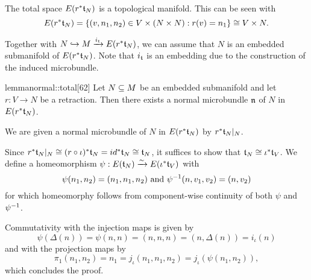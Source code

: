 \begin{myparagraph}
    The total space $E(r^*\mathfrak{t}_N)$ is a topological manifold.
    This can be seen with
    \[ E(r^*\mathfrak{t}_N) = \{(v, n_1, n_2) \in V \times (N \times N):r(v) = n_1\} \cong V \times N. \]

    Together with $N \hookrightarrow{} M \xrightarrow{i_{\mathfrak{t}}} E(r^*\mathfrak{t}_N)$, we can assume that
    $N$ is an embedded submanifold of $E(r^*\mathfrak{t}_N)$.
    Note that $i_{\mathfrak{t}}$ is an embedding due to the construction of the induced microbundle.
\end{myparagraph}

\begin{mystatement}{lemma}{normal::total}[62]
    Let $N \subseteq{} M$ be an embedded submanifold and let $r: V \to N$ be a retraction.
    Then there exists a normal microbundle $\mathfrak{n}$ of $N$ in $E(r^*\mathfrak{t}_N)$. %
\end{mystatement}

\begin{myproof}
    We are given a normal microbundle of $N$ in $E(r^*\mathfrak{t}_N)$ by $r^*\mathfrak{t}_N\vert_{N}$.
    
    Since $r^*\mathfrak{t}_N\vert_{N} \cong (r \circ \iota)^*\mathfrak{t}_N = id^*\mathfrak{t}_N \cong \mathfrak{t}_N$,
    it suffices to show that $\mathfrak{t}_N \cong \iota^*\mathfrak{t}_V$.
    We define a homeomorphism $\psi: E(\mathfrak{t}_N) \xrightarrow{\sim} E(\iota^*\mathfrak{t}_V)$ with
    \[ \psi(n_1, n_2) = (n_1, n_1, n_2) \text{ and } \psi^{-1}(n, v_1, v_2) = (n, v_2) \]
    for which homeomorphy follows from component-wise
    continuity of both $\psi$ and $\psi^{-1}$.
    
    Commutativity with the injection maps is given by
    \[ \psi(\Delta(n)) = \psi(n, n) = (n, n, n) = (n, \Delta(n)) = i_\iota(n) \]
    and with the projection maps by
    \[ \pi_1(n_1, n_2) = n_1 = j_\iota(n_1, n_1, n_2) = j_\iota(\psi(n_1, n_2)), \]
    which concludes the proof.
    
\end{myproof}